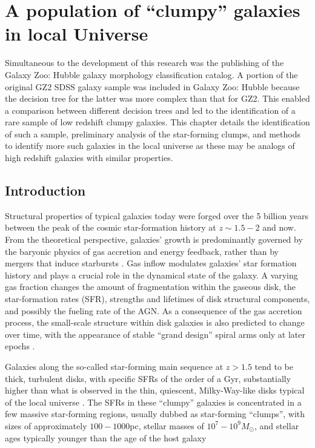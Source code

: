 
\chapter{A population of ``clumpy'' galaxies in local Universe}\label{chap:5}
Simultaneous to the development of this research was the publishing of the Galaxy Zoo: Hubble galaxy morphology classification catalog. A portion of the original GZ2 SDSS galaxy sample was included in Galaxy Zoo: Hubble because the decision tree for the latter was more complex than that for GZ2. This enabled a comparison between different decision trees and led to the identification of a rare sample of low redshift clumpy galaxies. This chapter details the identification of such a sample, preliminary analysis of the star-forming clumps, and methods to identify more such galaxies in the local universe as these may be analogs of high redshift galaxies with similar properties.


\section{Introduction}
Structural properties of typical galaxies today were forged over the 5 billion years between the peak of the cosmic star-formation history at $z\sim1.5-2$ and now. From the theoretical perspective, galaxies’ growth is predominantly governed by the baryonic physics of gas accretion and energy feedback, rather than by mergers that induce starbursts \citep{Somerville2015}. Gas inflow modulates galaxies’ star formation history and plays a crucial role in the dynamical state of the galaxy. A varying gas fraction changes the amount of fragmentation within the gaseous disk, the star-formation rates (SFR), strengths and lifetimes of disk structural components, and possibly the fueling rate of the AGN. As a consequence of the gas accretion process, the small-scale structure within disk galaxies is also predicted to change over time, with the appearance of stable “grand design” spiral arms only at later epochs \citep{Oppenheimer2010,Bouche2010,Dave2011b,Dave2011a,Lilly2013,Hirschmann2013}.


Galaxies along the so-called star-forming main sequence at $z>1.5$ \citep{Noeske2007} tend to be thick, turbulent disks, with specific SFRs of the order of a Gyr, substantially higher than what is observed in the thin, quiescent, Milky-Way-like disks typical of the local universe \citep{Genzel2008}. The SFRs in these ``clumpy'' galaxies is concentrated in a few massive star-forming regions, usually dubbed as star-forming “clumps”, with sizes of approximately $100-1000$pc, stellar masses of $10^7 - 10^9M_{\odot}$, and stellar ages typically younger than the age of the host galaxy \citep[e.g.,][]{Elmegreen2005,Genzel2011, Guo2012,Guo2015}

